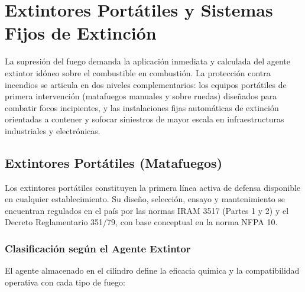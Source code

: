 \chapter{Extintores Portátiles y Sistemas Fijos de Extinción}
\label{sec.cap6:sistemas_extincion}

La supresión del fuego demanda la aplicación inmediata y calculada del agente extintor idóneo sobre el combustible en
combustión. La protección contra incendios se articula en dos niveles complementarios: los equipos portátiles de primera
intervención (matafuegos manuales y sobre ruedas) diseñados para combatir focos incipientes, y las instalaciones fijas
automáticas de extinción orientadas a contener y sofocar siniestros de mayor escala en infraestructuras industriales y
electrónicas.

\section{Extintores Portátiles (Matafuegos)}
\label{sec.cap6:extintores}

Los extintores portátiles constituyen la primera línea activa de defensa disponible en cualquier establecimiento. Su
diseño, selección, ensayo y mantenimiento se encuentran regulados en el país por las normas IRAM 3517 (Partes 1 y 2) y el
Decreto Reglamentario 351/79, con base conceptual en la norma NFPA 10.

\subsection{Clasificación según el Agente Extintor}

El agente almacenado en el cilindro define la eficacia química y la compatibilidad operativa con cada tipo de fuego:

